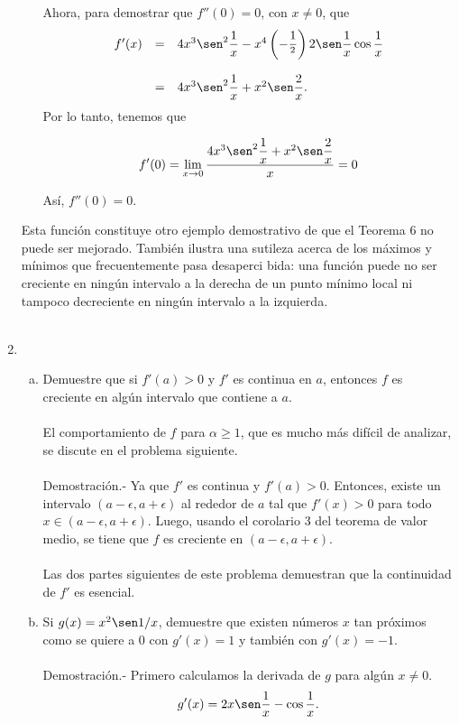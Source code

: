 \begin{enumerate}[\bfseries 1.]
\begin{enumerate}
		Ahora, para demostrar que $f''(0)=0$, con $x\neq 0$, que
		$$
		\begin{array}{rcl}
		    f'(x) &=& 4x^3\sen^2\dfrac{1}{x}-x^4\left(-\dfrac{1}{^2}\right)2\sen \dfrac{1}{x}\cos\dfrac{1}{x}\\\\
			  &=& 4x^3\sen^2\dfrac{1}{x}+x^2\sen\dfrac{2}{x}.
		\end{array}
		$$
		Por lo tanto, tenemos que

		$$f'(0)=\lim_{x\to 0}\dfrac{4x^3\sen^2\dfrac{1}{x}+x^2\sen\dfrac{2}{x}}{x}=0$$

		Así, $f''(0)=0.$\\

	\end{enumerate}

	Esta función constituye otro ejemplo demostrativo de que el Teorema 6 no puede ser mejorado.
También ilustra una sutileza acerca de los máximos y mínimos que frecuentemente pasa desaperci­
bida: una función puede no ser creciente en ningún intervalo a la derecha de un punto mínimo local
ni tampoco decreciente en ningún intervalo a la izquierda.\\\\

    \item 
	\begin{enumerate}[(a)]

	    \item Demuestre que si $f'(a)>0$ y $f'$ es continua en $a$, entonces $f$ es creciente en algún intervalo que contiene a $a$.\\\\
		El comportamiento de $f$ para $\alpha\geq 1$, que es mucho más difícil de analizar, se discute en el problema siguiente.\\\\
		Demostración.-\; Ya que $f'$ es continua y $f'(a)>0$. Entonces, existe un intervalo $(a-\epsilon,a+\epsilon)$ al rededor de $a$ tal que $f'(x)>0$ para todo $x\in(a-\epsilon,a+\epsilon)$. Luego, usando el corolario 3 del teorema de valor medio, se tiene que $f$ es creciente en $(a-\epsilon,a+\epsilon)$.\\\\

	    Las dos partes siguientes de este problema demuestran que la continuidad de $f'$ es esencial.\\

	    \item Si $g(x)=x^2\sen 1/x$, demuestre que existen números $x$ tan próximos como se quiere a $0$ con $g'(x)=1$ y también con $g'(x)=-1$.\\\\
		Demostración.-\; Primero calculamos la derivada de $g$ para algún $x\neq 0$.
		$$g'(x)=2x\sen \dfrac{1}{x}-\cos \dfrac{1}{x}.$$


\end{enumerate}
\end{enumerate}
